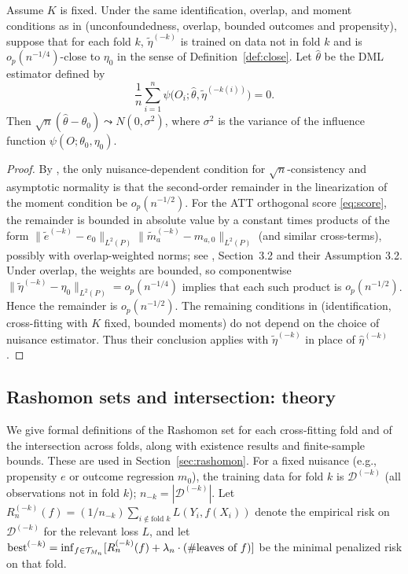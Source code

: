 \documentclass[12pt]{article}
\begin{document}
\begin{theorem}
\label{thm:dml-alt}
Assume $K$ is fixed. Under the same identification, overlap, and moment conditions as in \citet{chernozhukov2018} (unconfoundedness, overlap, bounded outcomes and propensity), suppose that for each fold $k$, $\tilde{\eta}^{(-k)}$ is trained on data not in fold $k$ and is $o_p(n^{-1/4})$-close to $\eta_0$ in the sense of Definition~\ref{def:close}. Let $\hat\theta$ be the DML estimator defined by
\[
\frac{1}{n} \sum_{i=1}^n \psi\bigl(O_i; \hat\theta, \tilde{\eta}^{(-k(i))}\bigr) = 0.
\]
Then $\sqrt{n}(\hat\theta - \theta_0) \leadsto N(0, \sigma^2)$, where $\sigma^2$ is the variance of the influence function $\psi(O; \theta_0, \eta_0)$.
\end{theorem}
\begin{proof}
By \citet{chernozhukov2018}, the only nuisance-dependent condition for $\sqrt{n}$-consistency and asymptotic normality is that the second-order remainder in the linearization of the moment condition be $o_p(n^{-1/2})$. For the ATT orthogonal score \eqref{eq:score}, the remainder is bounded in absolute value by a constant times products of the form $\|\tilde{e}^{(-k)} - e_0\|_{L^2(P)} \|\tilde{m}_a^{(-k)} - m_{a,0}\|_{L^2(P)}$ (and similar cross-terms), possibly with overlap-weighted norms; see \citet{chernozhukov2018}, Section~3.2 and their Assumption 3.2. Under overlap, the weights are bounded, so componentwise $\|\tilde{\eta}^{(-k)} - \eta_0\|_{L^2(P)} = o_p(n^{-1/4})$ implies that each such product is $o_p(n^{-1/2})$. Hence the remainder is $o_p(n^{-1/2})$. The remaining conditions in \citet{chernozhukov2018} (identification, cross-fitting with $K$ fixed, bounded moments) do not depend on the choice of nuisance estimator. Thus their conclusion applies with $\tilde{\eta}^{(-k)}$ in place of $\hat\eta^{(-k)}$.
\end{proof}

\subsection{Rashomon sets and intersection: theory}
\label{app:rashomon}

We give formal definitions of the Rashomon set for each cross-fitting fold and of the intersection across folds, along with existence results and finite-sample bounds. These are used in Section~\ref{sec:rashomon}. For a fixed nuisance (e.g., propensity $e$ or outcome regression $m_0$), the training data for fold $k$ is $\mathcal{D}^{(-k)}$ (all observations not in fold $k$); $n_{-k} = |\mathcal{D}^{(-k)}|$. Let $R_n^{(-k)}(f) = (1/n_{-k}) \sum_{i \notin \text{fold } k} L(Y_i, f(X_i))$ denote the empirical risk on $\mathcal{D}^{(-k)}$ for the relevant loss $L$, and let $\text{best}^{(-k)} = \inf_{f \in \mathcal{T}_{M_n}} [ R_n^{(-k)}(f) + \lambda_n \cdot (\#\text{leaves of } f) ]$ be the minimal penalized risk on that fold.
\end{document}
